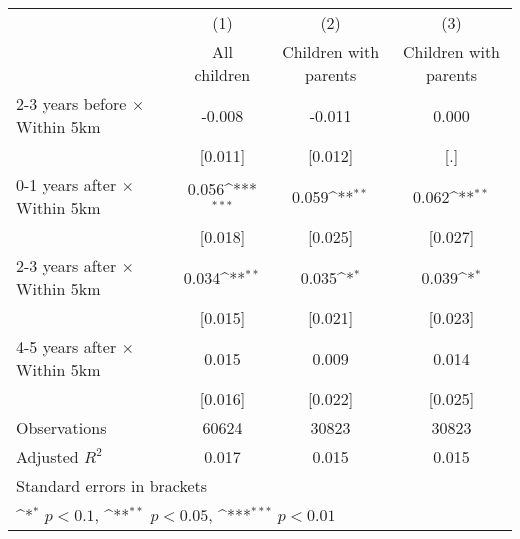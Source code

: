 {
\def\sym#1{\ifmmode^{#1}\else\(^{#1}\)\fi}
\begin{tabular}{l*{3}{c}}
\hline\hline
                    &\multicolumn{1}{c}{(1)}&\multicolumn{1}{c}{(2)}&\multicolumn{1}{c}{(3)}\\
                    &\multicolumn{1}{c}{All children}&\multicolumn{1}{c}{Children with parents}&\multicolumn{1}{c}{Children with parents}\\
\hline
2-3 years before $\times$ Within 5km&      -0.008         &      -0.011         &       0.000         \\
                    &     [0.011]         &     [0.012]         &         [.]         \\
0-1 years after $\times$ Within 5km&       0.056\sym{***}&       0.059\sym{**} &       0.062\sym{**} \\
                    &     [0.018]         &     [0.025]         &     [0.027]         \\
2-3 years after $\times$ Within 5km&       0.034\sym{**} &       0.035\sym{*}  &       0.039\sym{*}  \\
                    &     [0.015]         &     [0.021]         &     [0.023]         \\
4-5 years after $\times$ Within 5km&       0.015         &       0.009         &       0.014         \\
                    &     [0.016]         &     [0.022]         &     [0.025]         \\
\hline
Observations        &       60624         &       30823         &       30823         \\
Adjusted \(R^{2}\)  &       0.017         &       0.015         &       0.015         \\
\hline\hline
\multicolumn{4}{l}{\footnotesize Standard errors in brackets}\\
\multicolumn{4}{l}{\footnotesize \sym{*} \(p<0.1\), \sym{**} \(p<0.05\), \sym{***} \(p<0.01\)}\\
\end{tabular}
}
